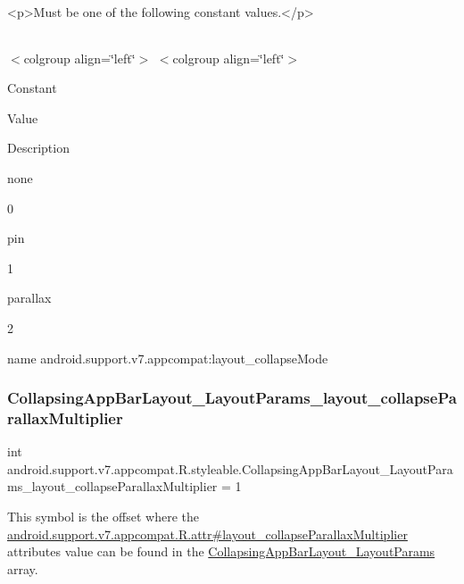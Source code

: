 \begin{DoxyVerb}      <p>Must be one of the following constant values.</p>
\end{DoxyVerb}
 \tabulinesep=1mm
\begin{longtabu} spread 0pt [c]{*{0}{|X[-1]}|}
\hline
\end{longtabu}
$<$colgroup align=\char`\"{}left\char`\"{}$>$ $<$colgroup align=\char`\"{}left\char`\"{}$>$ 

Constant

Value

Description 

{\ttfamily none}

0

{\ttfamily pin}

1

{\ttfamily parallax}

2

name android.\+support.\+v7.\+appcompat\+:layout\+\_\+collapse\+Mode \mbox{\label{classandroid_1_1support_1_1v7_1_1appcompat_1_1R_1_1styleable_a781b2b43f44b07db5eb37ae584beb420}} 
\subsubsection{\texorpdfstring{Collapsing\+App\+Bar\+Layout\+\_\+\+Layout\+Params\+\_\+layout\+\_\+collapse\+Parallax\+Multiplier}{CollapsingAppBarLayout\_LayoutParams\_layout\_collapseParallaxMultiplier}}
{\footnotesize\ttfamily int android.\+support.\+v7.\+appcompat.\+R.\+styleable.\+Collapsing\+App\+Bar\+Layout\+\_\+\+Layout\+Params\+\_\+layout\+\_\+collapse\+Parallax\+Multiplier = 1\hspace{0.3cm}{\ttfamily [static]}}

This symbol is the offset where the \hyperlink{classandroid_1_1support_1_1v7_1_1appcompat_1_1R_1_1attr_a36de735fcffce1fbe2484a4b33986e9e}{android.\+support.\+v7.\+appcompat.\+R.\+attr\#layout\+\_\+collapse\+Parallax\+Multiplier} attribute\textquotesingle{}s value can be found in the \hyperlink{classandroid_1_1support_1_1v7_1_1appcompat_1_1R_1_1styleable_a12010970910a1c80a9bf9f6983f00001}{Collapsing\+App\+Bar\+Layout\+\_\+\+Layout\+Params} array.


